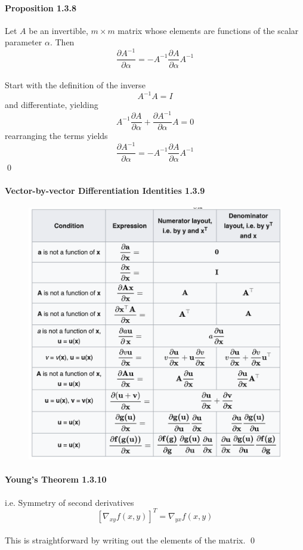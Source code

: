 \documentclass[11pt]{article}
\begin{document}
\paragraph{Proposition 1.3.8}
Let $A$ be an invertible, $m \times m$ matrix whose elements are functions of the scalar parameter $\alpha$. Then
$$\frac{\partial A^{-1}}{\partial \alpha} = -A^{-1}\frac{\partial A}{\partial \alpha} A^{-1}$$
 \\
Start with the definition of the inverse
$$A^{-1}A = I$$
and differentiate, yielding
$$A^{-1}\frac{\partial A}{\partial \alpha} + \frac{\partial A^{-1}}{\partial \alpha}A = 0$$
rearranging the terms yields
$$\frac{\partial A^{-1}}{\partial \alpha}  = -A^{-1}\frac{\partial A}{\partial \alpha}A^{-1}$$\qed

\paragraph{Vector-by-vector Differentiation Identities 1.3.9}
 \begin{figure}[h]
	\centering
	\includegraphics[scale=0.6]{p1.png}
\end{figure}

\paragraph{Young's Theorem 1.3.10}
i.e. Symmetry of second derivatives
$$[\nabla_{xy}f(x,y)]^T = \nabla_{yx}f(x,y)$$
 \\
This is straightforward by writing out the elements of the matrix. \qed
\end{document}
